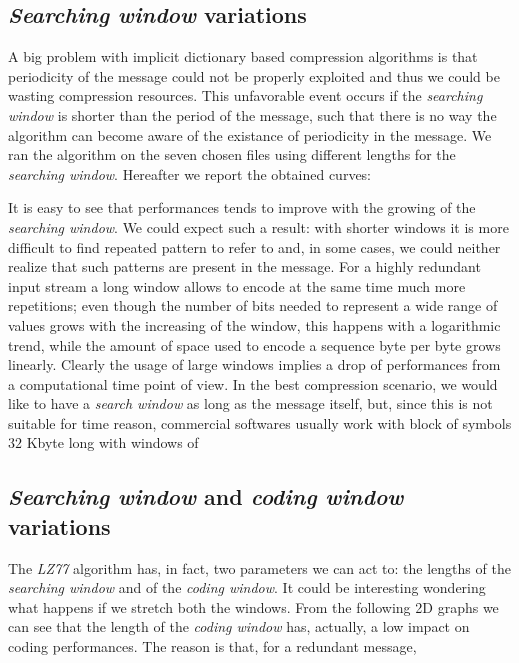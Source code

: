 \subsection{\textit{Searching window} variations}
A big problem with implicit dictionary based compression algorithms is that periodicity of the message could not be properly exploited and thus we could be wasting compression resources. This unfavorable event occurs if the \textit{searching window} is shorter than the period of the message, such that there is no way the algorithm can become aware of the existance of periodicity in the message. We ran the algorithm on the seven chosen files using different lengths for the \textit{searching window}. Hereafter we report the obtained curves:


It is easy to see that performances tends to improve with the growing of the \textit{searching window}. We could expect such a result: with shorter windows it is more difficult to find repeated pattern to refer to and, in some cases, we could neither realize that such patterns are present in the message. For a highly redundant input stream a long window allows to encode at the same time much more repetitions; even though the number of bits needed to represent a wide range of values grows with the increasing of the window, this happens with a logarithmic trend, while the amount of space used to encode a sequence byte per byte grows linearly. Clearly the usage of large windows implies a drop of performances from a computational time point of view. 
In the best compression scenario, we would like to have a \textit{search window} as long as the message itself, but, since this is not suitable for time reason, commercial softwares usually work with block of symbols $32$ Kbyte long with windows of

\subsection{\textit{Searching window} and \textit{coding window} variations}
The \textit{LZ77} algorithm has, in fact, two parameters we can act to: the lengths of the \textit{searching window} and of the \textit{coding window}. It could be interesting wondering what happens if we stretch both the windows. From the following 2D graphs we can see that the length of the \textit{coding window} has, actually, a low impact on coding performances. The reason is that, for a redundant message, 